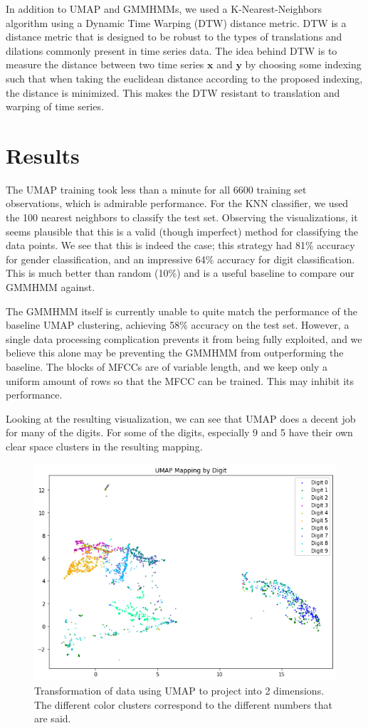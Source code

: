 \documentclass[11pt]{article}
\renewcommand{\vec}[1]{{\ensuremath{\bm{#1}}}}
\newcommand{\0}{{\vec  0 }}
\newcommand{\1}{{\mathbbm{  1} }}
\begin{document}
    In addition to UMAP and GMMHMMs, we used a K-Nearest-Neighbors algorithm using a Dynamic Time Warping (DTW) distance metric. DTW is a distance metric that is designed to be robust to the types of translations and dilations commonly present in time series data. The idea behind DTW is to measure the distance between two time series $\vec{x}$ and $\vec{y}$ by choosing some indexing such that when taking the euclidean distance according to the proposed indexing, the distance is minimized. This makes the DTW resistant to translation and warping of time series. 
        
    \section{Results}
    The UMAP training took less than a minute for all 6600 training set observations, which is admirable performance. For the KNN classifier, we used the 100 nearest neighbors to classify the test set. Observing the visualizations, it seems plausible that this is a valid (though imperfect) method for classifying the data points. We see that this is indeed the case; this strategy had 81\% accuracy for gender classification, and an impressive 64\% accuracy for digit classification. This is much better than random (10\%) and is a useful baseline to compare our GMMHMM against. 
    
    The GMMHMM itself is currently unable to quite match the performance of the baseline UMAP clustering, achieving 58\% accuracy on the test set. However, a single data processing complication prevents it from being fully exploited, and we believe this alone may be preventing the GMMHMM from outperforming the baseline. The blocks of MFCCs are of variable length, and we keep only a uniform amount of rows so that the MFCC can be trained. This may inhibit its performance.
    
    Looking at the resulting visualization, we can see that UMAP does a decent job for many of the digits. For some of the digits, especially 9 and 5 have their own clear space clusters in the resulting mapping. 
    
    
    \begin{figure}
        \centering
        \includegraphics[width=0.7\linewidth]{UMAPdigitcomparison}
        \caption{Transformation of data using UMAP to project into 2 dimensions. The different color clusters correspond to the different numbers that are said.}
        \label{fig:umapdigitcomparison}
    \end{figure}
    
\end{document}
